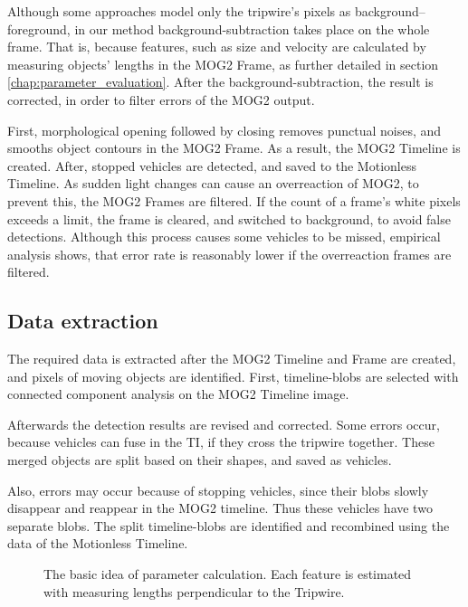 Although some approaches model only the tripwire's pixels as background--foreground, in our method background-subtraction takes place on the whole frame.
That is, because features, such as size and velocity are calculated by measuring objects' lengths in the MOG2 Frame, as further detailed in section \ref{chap:parameter_evaluation}.
After the background-subtraction, the result is corrected, in order to filter errors of the MOG2 output.

First, morphological opening followed by closing removes punctual noises, and smooths object contours in the MOG2 Frame.
As a result, the MOG2 Timeline is created.
After, stopped vehicles are detected, and saved to the Motionless Timeline.
As sudden light changes can cause an overreaction of MOG2, to prevent this, the MOG2 Frames are filtered.
If the count of a frame's white pixels exceeds a limit, the frame is cleared, and switched to background, to avoid false detections.
Although this process causes some vehicles to be missed, empirical analysis shows, that error rate is reasonably lower if the overreaction frames are filtered.
\subsection{Data extraction}
The required data is extracted after the MOG2 Timeline and Frame are created, and pixels of moving objects are identified.
First, timeline-blobs are selected with connected component analysis on the MOG2 Timeline image.

Afterwards the detection results are revised and corrected.
Some errors occur, because vehicles can fuse in the TI, if they cross the tripwire together. These merged objects are split based on their shapes, and saved as vehicles.

Also, errors may occur because of stopping vehicles, since their blobs slowly disappear and reappear in the MOG2 timeline.
Thus these vehicles have two separate blobs.
The split timeline-blobs are identified and recombined using the data of the Motionless Timeline. 

\begin{figure}[p]
	\centering
	
	\caption{The basic idea of parameter calculation. Each feature is estimated with measuring lengths perpendicular to the Tripwire.\label{fig:size_speed_following_distance}}
\end{figure}

